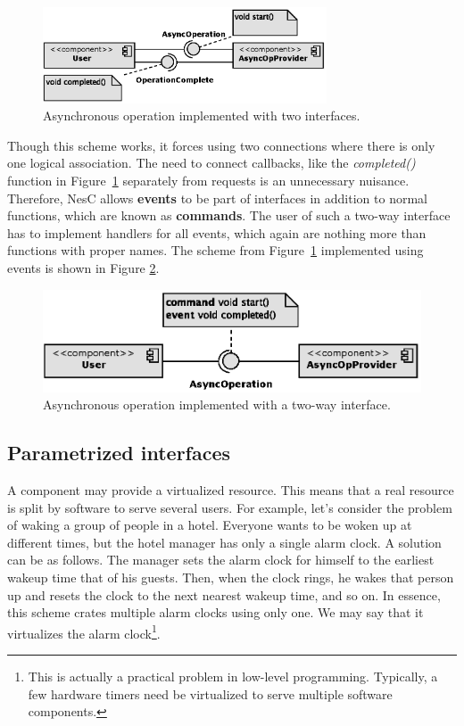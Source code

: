 \begin{figure}[h]
  \centering
  \includegraphics[width=0.75\textwidth]{diagrams/two_way_interface1.eps}
  \caption{Asynchronous operation implemented with two interfaces.}
  \label{fig:two_way_interface1}
\end{figure}

Though this scheme works, it forces using two connections where there is only one logical association. The need to connect callbacks, like the \emph{completed()} function in Figure~\ref{fig:two_way_interface1} separately from requests is an unnecessary nuisance. Therefore, NesC allows {\bf events} to be part of interfaces in addition to normal functions, which are known as {\bf commands}. The user of such a two-way interface has to implement handlers for all events, which again are nothing more than functions with proper names. The scheme from Figure~\ref{fig:two_way_interface1} implemented using events is shown in Figure \ref{fig:two_way_interface2}.

\begin{figure}[h]
  \centering
  \includegraphics{diagrams/two_way_interface2.eps}
  \caption{Asynchronous operation implemented with a two-way interface.}
  \label{fig:two_way_interface2}
\end{figure}

\subsection{Parametrized interfaces}
A component may provide a virtualized resource. This means that a real resource is split by software to serve several users. For example, let's consider the problem of waking a group of people in a hotel.  Everyone wants to be woken up at different times, but the hotel manager has only a single alarm clock. A solution can be as follows. The manager sets the alarm clock for himself to the earliest wakeup time that of his guests. Then, when the clock rings, he  wakes that person up and resets the clock to the next nearest wakeup time, and so on. In essence, this scheme crates multiple alarm clocks using only one. We may say that it virtualizes the alarm clock\footnote{This is actually a practical problem in low-level programming. Typically, a few hardware timers need be virtualized to serve multiple software components.}.

